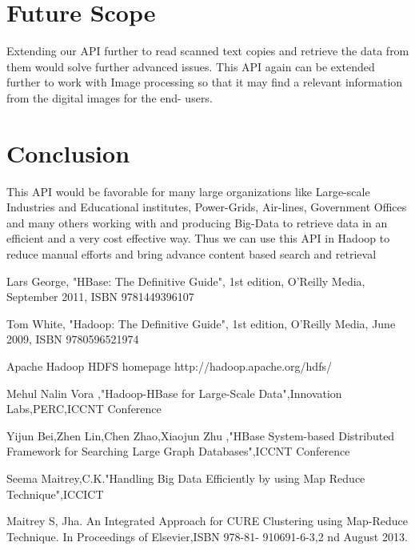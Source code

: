 \documentclass{IEEEtran}
\begin{document}
\section{Future Scope}
Extending our API further to read scanned text copies and retrieve the data from them would solve further advanced issues. This API again can be extended further to work with Image processing so that it may find a relevant information from the digital images for the end- users.

\section{Conclusion}
This API would be favorable for many large organizations like Large-scale Industries and Educational institutes, Power-Grids, Air-lines, Government Offices and many others working with and producing Big-Data to retrieve data in an efficient and a very cost effective way.
Thus we can use this API in Hadoop to reduce manual efforts and bring advance content based search and retrieval

\begin{thebibliography}{7}
 Lars George, "HBase: The Definitive Guide", 1st edition, O'Reilly Media, September 2011, ISBN 9781449396107


 Tom White, "Hadoop: The Definitive Guide", 1st edition, O'Reilly Media, June 2009, ISBN 9780596521974

 Apache  Hadoop HDFS homepage http://hadoop.apache.org/hdfs/

 Mehul Nalin Vora ,"Hadoop-HBase for Large-Scale Data",Innovation Labs,PERC,ICCNT Conference

 Yijun Bei,Zhen Lin,Chen Zhao,Xiaojun Zhu ,"HBase System-based Distributed Framework for Searching Large Graph Databases",ICCNT Conference


 Seema Maitrey,C.K."Handling Big Data Efficiently by using Map Reduce Technique",ICCICT

 Maitrey S, Jha. An Integrated Approach for CURE Clustering using Map-Reduce Technique. In Proceedings of Elsevier,ISBN 978-81- 910691-6-3,2 nd August 2013.


\end{thebibliography}
\end{document}
